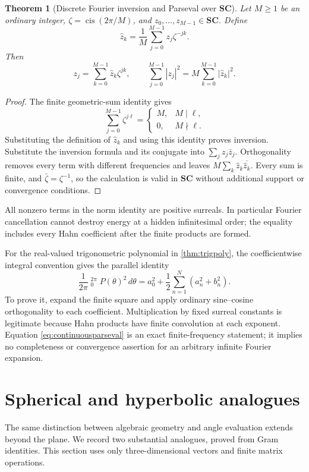\documentclass[11pt,letterpaper]{article}
\newtheorem{theorem}{Theorem}[section]
\theoremstyle{definition}
\theoremstyle{remark}
\newcommand{\SC}{\mathbf{SC}}
\newcommand{\cis}{\operatorname{cis}}
\newcommand{\HInt}{\mathop{\int^{\!H}}\nolimits}
\numberwithin{equation}{section}
\begin{document}
\begin{theorem}[Discrete Fourier inversion and Parseval over $\SC$]\label{thm:dft}
Let $M\ge1$ be an ordinary integer, $\zeta=\cis(2\pi/M)$, and $z_0,\ldots,z_{M-1}\in\SC$. Define
\[
 \widehat z_k=\frac1M\sum_{j=0}^{M-1}z_j\zeta^{-jk}.
\]
Then
\begin{equation}\label{eq:dft}
 z_j=\sum_{k=0}^{M-1}\widehat z_k\zeta^{jk},\qquad
 \sum_{j=0}^{M-1}|z_j|^2=M\sum_{k=0}^{M-1}|\widehat z_k|^2.
\end{equation}
\end{theorem}
\begin{proof}
The finite geometric-sum identity gives
\[
 \sum_{j=0}^{M-1}\zeta^{j\ell}
 =\begin{cases}M,&M\mid\ell,\\0,&M\nmid\ell.\end{cases}
\]
Substituting the definition of $\widehat z_k$ and using this identity proves inversion. Substitute the inversion formula and its conjugate into $\sum_j z_j\bar z_j$. Orthogonality removes every term with different frequencies and leaves $M\sum_k\widehat z_k\overline{\widehat z_k}$. Every sum is finite, and $\bar\zeta=\zeta^{-1}$, so the calculation is valid in $\SC$ without additional support or convergence conditions.
\end{proof}
All nonzero terms in the norm identity are positive surreals. In particular Fourier cancellation cannot destroy energy at a hidden infinitesimal order; the equality includes every Hahn coefficient after the finite products are formed.

For the real-valued trigonometric polynomial in \cref{thm:trigpoly}, the coefficientwise integral convention gives the parallel identity
\begin{equation}\label{eq:continuousparseval}
 \frac1{2\pi}\HInt_0^{2\pi}P(\theta)^2\,d\theta
 =a_0^2+\frac12\sum_{n=1}^N(a_n^2+b_n^2).
\end{equation}
To prove it, expand the finite square and apply ordinary sine--cosine orthogonality to each coefficient. Multiplication by fixed surreal constants is legitimate because Hahn products have finite convolution at each exponent. Equation \eqref{eq:continuousparseval} is an exact finite-frequency statement; it implies no completeness or convergence assertion for an arbitrary infinite Fourier expansion.

\section{Spherical and hyperbolic analogues}\label{sec:curved}
The same distinction between algebraic geometry and angle evaluation extends beyond the plane. We record two substantial analogues, proved from Gram identities. This section uses only three-dimensional vectors and finite matrix operations.
\end{document}
